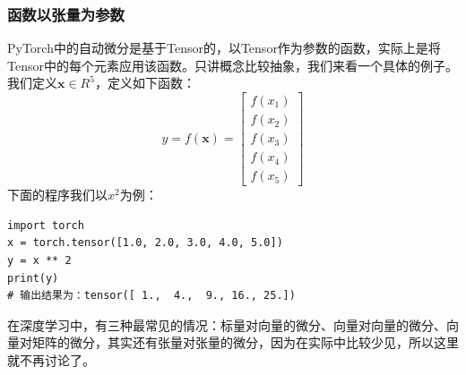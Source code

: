 \documentclass[UTF8]{article}
\begin{document}
\subsubsection{函数以张量为参数}
PyTorch中的自动微分是基于Tensor的，以Tensor作为参数的函数，实际上是将Tensor中的每个元素应用该函数。只讲概念比较抽象，我们来看一个具体的例子。
我们定义$\boldsymbol{x} \in R^{5}$，定义如下函数：
\begin{equation}
y=f(\boldsymbol{x})=\begin{bmatrix}
f(x_{1}) \\
f(x_{2}) \\
f(x_{3}) \\
f(x_{4}) \\
f(x_{5})
\end{bmatrix}
\label{autodif-tensor-1}
\end{equation}
下面的程序我们以$x^{2}$为例：
\begin{lstlisting}
import torch
x = torch.tensor([1.0, 2.0, 3.0, 4.0, 5.0])
y = x ** 2
print(y)
# 输出结果为：tensor([ 1.,  4.,  9., 16., 25.])
\end{lstlisting}
在深度学习中，有三种最常见的情况：标量对向量的微分、向量对向量的微分、向量对矩阵的微分，其实还有张量对张量的微分，因为在实际中比较少见，所以这里就不再讨论了。
\end{document}
